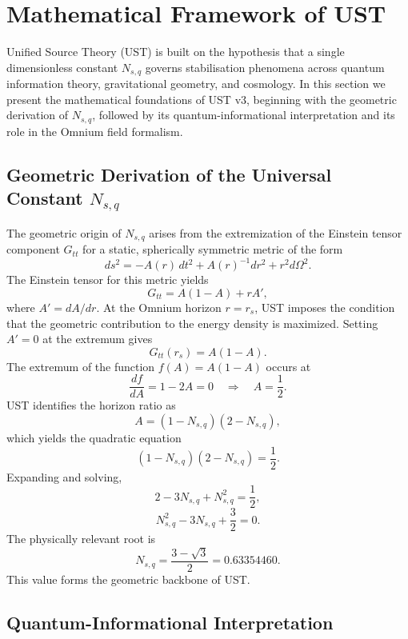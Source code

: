 
\section{Mathematical Framework of UST}

Unified Source Theory (UST) is built on the hypothesis that a single
dimensionless constant $N_{s,q}$ governs stabilisation phenomena across
quantum information theory, gravitational geometry, and cosmology. In this
section we present the mathematical foundations of UST v3, beginning with the
geometric derivation of $N_{s,q}$, followed by its quantum-informational
interpretation and its role in the Omnium field formalism.

\subsection{Geometric Derivation of the Universal Constant $N_{s,q}$}

The geometric origin of $N_{s,q}$ arises from the extremization of the
Einstein tensor component $G_{tt}$ for a static, spherically symmetric metric
of the form
\[
ds^2 = -A(r)\,dt^2 + A(r)^{-1}dr^2 + r^2 d\Omega^2.
\]
The Einstein tensor for this metric yields
\[
G_{tt} = A(1-A) + rA',
\]
where $A' = dA/dr$. At the Omnium horizon $r=r_s$, UST imposes the condition
that the geometric contribution to the energy density is maximized. Setting
$A'=0$ at the extremum gives
\[
G_{tt}(r_s) = A(1-A).
\]
The extremum of the function $f(A)=A(1-A)$ occurs at
\[
\frac{df}{dA} = 1 - 2A = 0 \quad \Rightarrow \quad A = \frac{1}{2}.
\]
UST identifies the horizon ratio as
\[
A = (1-N_{s,q})(2-N_{s,q}),
\]
which yields the quadratic equation
\[
(1-N_{s,q})(2-N_{s,q}) = \frac{1}{2}.
\]
Expanding and solving,
\[
2 - 3N_{s,q} + N_{s,q}^2 = \frac{1}{2},
\]
\[
N_{s,q}^2 - 3N_{s,q} + \frac{3}{2} = 0.
\]
The physically relevant root is
\[
N_{s,q} = \frac{3 - \sqrt{3}}{2} = 0.63354460.
\]
This value forms the geometric backbone of UST.

\subsection{Quantum-Informational Interpretation}


